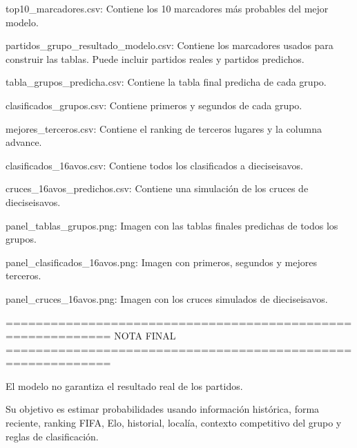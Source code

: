 top10_marcadores.csv:
Contiene los 10 marcadores más probables del mejor modelo.

partidos_grupo_resultado_modelo.csv:
Contiene los marcadores usados para construir las tablas. Puede incluir partidos reales y partidos predichos.

tabla_grupos_predicha.csv:
Contiene la tabla final predicha de cada grupo.

clasificados_grupos.csv:
Contiene primeros y segundos de cada grupo.

mejores_terceros.csv:
Contiene el ranking de terceros lugares y la columna advance.

clasificados_16avos.csv:
Contiene todos los clasificados a dieciseisavos.

cruces_16avos_predichos.csv:
Contiene una simulación de los cruces de dieciseisavos.

panel_tablas_grupos.png:
Imagen con las tablas finales predichas de todos los grupos.

panel_clasificados_16avos.png:
Imagen con primeros, segundos y mejores terceros.

panel_cruces_16avos.png:
Imagen con los cruces simulados de dieciseisavos.

============================================================
NOTA FINAL
============================================================

El modelo no garantiza el resultado real de los partidos.

Su objetivo es estimar probabilidades usando información histórica, forma reciente, ranking FIFA, Elo, historial, localía, contexto competitivo del grupo y reglas de clasificación.
